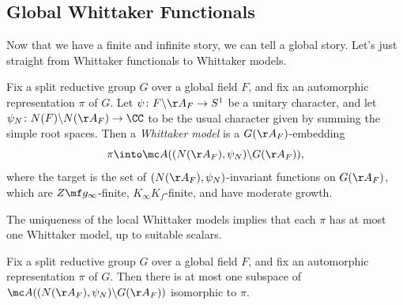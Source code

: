 \documentclass[../notes.tex]{subfiles}
\begin{document}
\subsection{Global Whittaker Functionals}
Now that we have a finite and infinite story, we can tell a global story. Let's just straight from Whittaker functionals to Whittaker models.
\begin{definition}
	Fix a split reductive group $G$ over a global field $F$, and fix an automorphic representation $\pi$ of $G$. Let $\psi\colon F\backslash\AA_F\to S^1$ be a unitary character, and let $\psi_N\colon N(F)\backslash N(\AA_F)\to\CC$ to be the usual character given by summing the simple root spaces. Then a \textit{Whittaker model} is a $G(\AA_F)$-embedding
	\[\pi\into\mc A((N(\AA_F),\psi_N)\backslash G(\AA_F)),\]
	where the target is the set of $(N(\AA_F),\psi_N)$-invariant functions on $G(\AA_F)$, which are $Z\mf g_\infty$-finite, $K_\infty K_f$-finite, and have moderate growth.
\end{definition}
The uniqueness of the local Whittaker models implies that each $\pi$ has at most one Whittaker model, up to suitable scalars.
\begin{theorem} \label{thm:global-whittaker-unique}
	Fix a split reductive group $G$ over a global field $F$, and fix an automorphic representation $\pi$ of $G$. Then there is at most one subspace of $\mc A((N(\AA_F),\psi_N)\backslash G(\AA_F))$ isomorphic to $\pi$.
\end{theorem}
\end{document}
